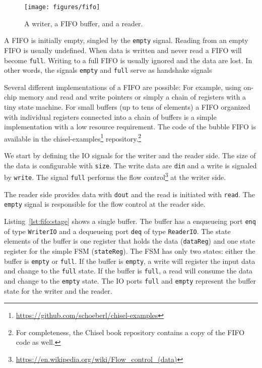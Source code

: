 \documentclass[%
    10pt,
    headinclude, footexclude,
    openright, %
    notitlepage,
    cleardoubleempty,
    headsepline,
    pointlessnumbers,
    bibtotoc, idxtotoc,
    ]{scrbook}
\newcommand{\code}[1]{{\small{\texttt{#1}}}}
\newcommand{\myref}[2]{\href{#1}{#2}}
\renewcommand{\myref}[2]{{#2}{\footnote{\url{#1}}}}
\begin{document}
\begin{figure}
  \centering
  \texttt{[image: figures/fifo]}
  \caption{A writer, a FIFO buffer, and a reader.}
  \label{fig:fifo}
\end{figure}

A FIFO is initially empty, singled by the \code{empty} signal. Reading
from an empty FIFO is usually undefined. When data is written and never
read a FIFO will become \code{full}. Writing to a full FIFO is usually ignored
and the data are lost. In other words, the signals \code{empty} and \code{full}
serve as handshake signals

Several different implementations of a FIFO are possible: For example, using on-chip
memory and read and write pointers or simply a chain of registers with a
tiny state machine. For small buffers (up to tens of elements) a FIFO organized
with individual registers connected into a chain of buffers is a simple
implementation with a low resource requirement.
The code of the bubble FIFO is available in the
\myref{https://github.com/schoeberl/chisel-examples}{chisel-examples}
repository.\footnote{For completeness, the Chisel book repository contains
a copy of the FIFO code as well.}

We start by defining the IO signals for the writer and the reader side.
The size of the data is configurable with \code{size}.
The write data are \code{din} and a write is signaled by \code{write}.
The signal \code{full} performs the
\myref{https://en.wikipedia.org/wiki/Flow_control_(data)}{flow control}
at the writer side.


The reader side provides data with \code{dout} and the read is initiated
with \code{read}. The \code{empty} signal is responsible for the flow control
at the reader side.


Listing~\ref{lst:fifo:stage} shows a single buffer. The buffer has a enqueueing port
\code{enq} of type \code{WriterIO} and a dequeueing port \code{deq} of type
\code{ReaderIO}. The state elements of the buffer is one register that holds the
data (\code{dataReg}) and one state register for the simple FSM (\code{stateReg}).
The FSM has only two states: either the buffer is \code{empty} or \code{full}.
If the buffer is \code{empty}, a write will register the input data and change
to the \code{full} state.
If the buffer is \code{full}, a read will consume the data and change to the
\code{empty} state.
The IO ports \code{full} and \code{empty} represent the buffer state for
the writer and the reader.
\end{document}
